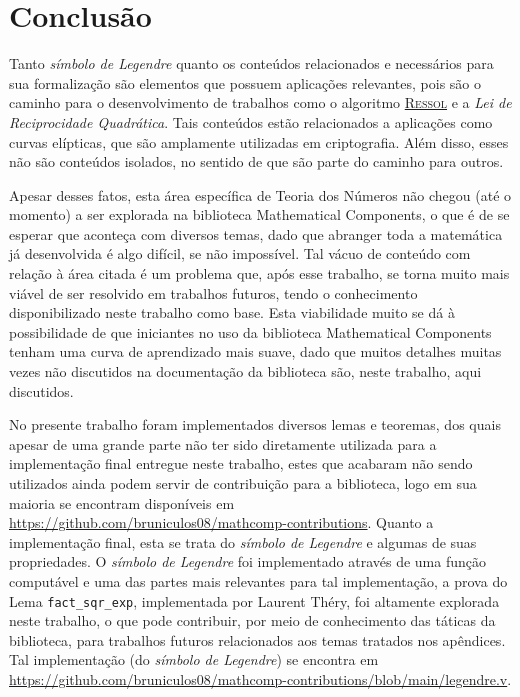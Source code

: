 \chapter{Conclusão}
\label{cap:conclusao}

Tanto \textit{símbolo de Legendre} quanto os conteúdos relacionados e necessários para sua formalização são elementos que possuem aplicações relevantes, pois são o caminho para o desenvolvimento de trabalhos como o algoritmo \hyperref[algo:ressol]{\textsc{Ressol}} e a \textit{Lei de Reciprocidade Quadrática}. Tais conteúdos estão relacionados a aplicações como curvas elípticas, que são amplamente utilizadas em criptografia. Além disso, esses não são conteúdos isolados, no sentido de que são parte do caminho para outros.

Apesar desses fatos, esta área específica de Teoria dos Números não chegou (até o momento) a ser explorada na biblioteca Mathematical Components, o que é de se esperar que aconteça com diversos temas, dado que abranger toda a matemática já desenvolvida é algo difícil, se não impossível. Tal vácuo de conteúdo com relação à área citada é um problema que, após esse trabalho, se torna muito mais viável de ser resolvido em trabalhos futuros, tendo o conhecimento disponibilizado neste trabalho como base. Esta viabilidade muito se dá à possibilidade de que iniciantes no uso da biblioteca Mathematical Components tenham uma curva de aprendizado mais suave, dado que muitos detalhes muitas vezes não discutidos na documentação da biblioteca são, neste trabalho, aqui discutidos.

No presente trabalho foram implementados diversos lemas e teoremas, dos quais apesar de uma grande parte não ter sido diretamente utilizada para a implementação final entregue neste trabalho, estes que acabaram não sendo utilizados ainda podem servir de contribuição para a biblioteca, logo em sua maioria se encontram disponíveis em \url{https://github.com/bruniculos08/mathcomp-contributions}. Quanto a implementação final, esta se trata do \textit{símbolo de Legendre} e algumas de suas propriedades. O \textit{símbolo de Legendre} foi implementado através de uma função computável e uma das partes mais relevantes para tal implementação, a prova do Lema \lstinline[language=coq]|fact_sqr_exp|, implementada por Laurent Théry, foi altamente explorada neste trabalho, o que pode contribuir, por meio de conhecimento das táticas da biblioteca, para trabalhos futuros relacionados aos temas tratados nos apêndices. Tal implementação (do \textit{símbolo de Legendre}) se encontra em \url{https://github.com/bruniculos08/mathcomp-contributions/blob/main/legendre.v}.

